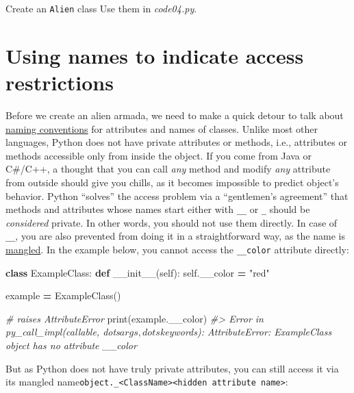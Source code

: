 \documentclass[
]{book}
\newenvironment{Shaded}{\begin{snugshade}}{\end{snugshade}}
\newcommand{\BuiltInTok}[1]{#1}
\newcommand{\CommentTok}[1]{\textcolor[rgb]{0.56,0.35,0.01}{\textit{#1}}}
\newcommand{\FunctionTok}[1]{\textcolor[rgb]{0.00,0.00,0.00}{#1}}
\newcommand{\KeywordTok}[1]{\textcolor[rgb]{0.13,0.29,0.53}{\textbf{#1}}}
\newcommand{\NormalTok}[1]{#1}
\newcommand{\OperatorTok}[1]{\textcolor[rgb]{0.81,0.36,0.00}{\textbf{#1}}}
\newcommand{\StringTok}[1]{\textcolor[rgb]{0.31,0.60,0.02}{#1}}
\newcommand{\VariableTok}[1]{\textcolor[rgb]{0.00,0.00,0.00}{#1}}
\begin{document}
Create an \texttt{Alien} class
Use them in \emph{code04.py}.

\hypertarget{using-names-to-indicate-access-restrictions}{%
\section{Using names to indicate access restrictions}\label{using-names-to-indicate-access-restrictions}}

Before we create an alien armada, we need to make a quick detour to talk about \href{https://peps.python.org/pep-0008}{naming conventions} for attributes and names of classes. Unlike most other languages, Python does not have private attributes or methods, i.e., attributes or methods accessible only from inside the object. If you come from Java or C\#/C++, a thought that you can call \emph{any} method and modify \emph{any} attribute from outside should give you chills, as it becomes impossible to predict object's behavior. Python ``solves'' the access problem via a ``gentlemen's agreement'' that methods and attributes whose names start either with \texttt{\_\_} or \texttt{\_} should be \emph{considered} private. In other words, you should not use them directly. In case of \texttt{\_\_}, you are also prevented from doing it in a straightforward way, as the name is \href{https://peps.python.org/pep-0008/\#descriptive-naming-styles}{mangled}. In the example below, you cannot access the \texttt{\_\_color} attribute directly:

\begin{Shaded}
\begin{Highlighting}[]
\KeywordTok{class}\NormalTok{ ExampleClass:}
  \KeywordTok{def} \FunctionTok{\_\_init\_\_}\NormalTok{(}\VariableTok{self}\NormalTok{):}
    \VariableTok{self}\NormalTok{.\_\_color }\OperatorTok{=} \StringTok{"red"}

\NormalTok{example }\OperatorTok{=}\NormalTok{ ExampleClass()}

\CommentTok{\# raises AttributeError}
\BuiltInTok{print}\NormalTok{(example.\_\_color)}
\CommentTok{\#\textgreater{} Error in py\_call\_impl(callable, dots$args, dots$keywords): AttributeError: \textquotesingle{}ExampleClass\textquotesingle{} object has no attribute \textquotesingle{}\_\_color\textquotesingle{}}
\end{Highlighting}
\end{Shaded}

But as Python does not have truly private attributes, you can still access it via its mangled name\texttt{object.\_\textless{}ClassName\textgreater{}\textless{}hidden\ attribute\ name\textgreater{}}:
\end{document}
